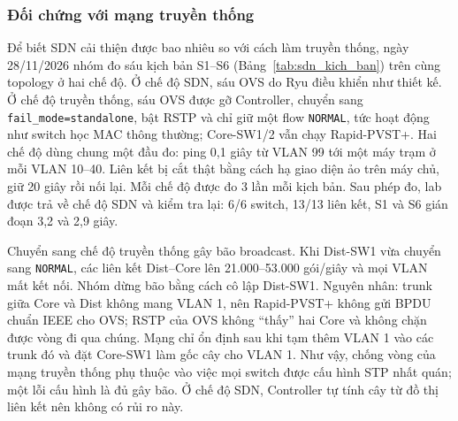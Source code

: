 \subsubsection{Đối chứng với mạng truyền thống}\label{sec:doi_chung_rstp}

Để biết SDN cải thiện được bao nhiêu so với cách làm truyền thống, ngày 28/11/2026 nhóm đo sáu kịch bản S1--S6 (Bảng~\ref{tab:sdn_kich_ban}) trên cùng topology ở hai chế độ. Ở chế độ SDN, sáu OVS do Ryu điều khiển như thiết kế. Ở chế độ truyền thống, sáu OVS được gỡ Controller, chuyển sang \texttt{fail\_mode=standalone}, bật RSTP và chỉ giữ một flow \texttt{NORMAL}, tức hoạt động như switch học MAC thông thường; Core-SW1/2 vẫn chạy Rapid-PVST+. Hai chế độ dùng chung một đầu đo: ping 0,1 giây từ VLAN 99 tới một máy trạm ở mỗi VLAN 10--40. Liên kết bị cắt thật bằng cách hạ giao diện ảo trên máy chủ, giữ 20 giây rồi nối lại. Mỗi chế độ được đo 3 lần mỗi kịch bản. Sau phép đo, lab được trả về chế độ SDN và kiểm tra lại: 6/6 switch, 13/13 liên kết, S1 và S6 gián đoạn 3,2 và 2,9 giây.

Chuyển sang chế độ truyền thống gây bão broadcast. Khi Dist-SW1 vừa chuyển sang \texttt{NORMAL}, các liên kết Dist--Core lên 21.000--53.000 gói/giây và mọi VLAN mất kết nối. Nhóm dừng bão bằng cách cô lập Dist-SW1. Nguyên nhân: trunk giữa Core và Dist không mang VLAN 1, nên Rapid-PVST+ không gửi BPDU chuẩn IEEE cho OVS; RSTP của OVS không ``thấy'' hai Core và không chặn được vòng đi qua chúng. Mạng chỉ ổn định sau khi tạm thêm VLAN 1 vào các trunk đó và đặt Core-SW1 làm gốc cây cho VLAN 1. Như vậy, chống vòng của mạng truyền thống phụ thuộc vào việc mọi switch được cấu hình STP nhất quán; một lỗi cấu hình là đủ gây bão. Ở chế độ SDN, Controller tự tính cây từ đồ thị liên kết nên không có rủi ro này.

